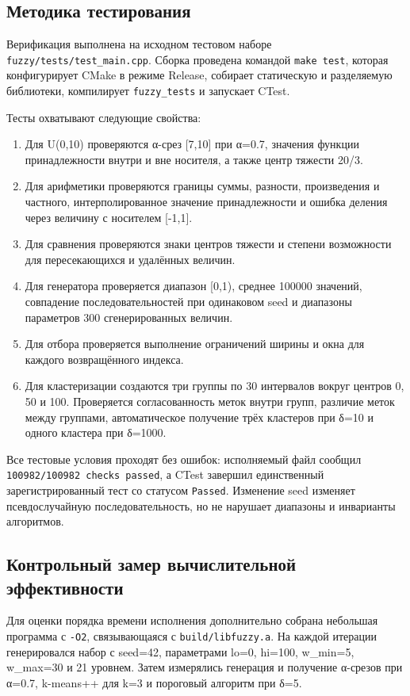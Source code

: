 \subsection{Методика тестирования}

Верификация выполнена на исходном тестовом наборе \texttt{fuzzy/tests/test\_main.cpp}. Сборка проведена командой \texttt{make test}, которая конфигурирует CMake в режиме Release, собирает статическую и разделяемую библиотеки, компилирует \texttt{fuzzy\_tests} и запускает CTest.

Тесты охватывают следующие свойства:

\begin{enumerate}
\item Для U(0,10) проверяются α-срез [7,10] при α=0.7, значения функции принадлежности внутри и вне носителя, а также центр тяжести 20/3.
\item Для арифметики проверяются границы суммы, разности, произведения и частного, интерполированное значение принадлежности и ошибка деления через величину с носителем [-1,1].
\item Для сравнения проверяются знаки центров тяжести и степени возможности для пересекающихся и удалённых величин.
\item Для генератора проверяется диапазон [0,1), среднее 100000 значений, совпадение последовательностей при одинаковом seed и диапазоны параметров 300 сгенерированных величин.
\item Для отбора проверяется выполнение ограничений ширины и окна для каждого возвращённого индекса.
\item Для кластеризации создаются три группы по 30 интервалов вокруг центров 0, 50 и 100. Проверяется согласованность меток внутри групп, различие меток между группами, автоматическое получение трёх кластеров при δ=10 и одного кластера при δ=1000.
\end{enumerate}

Все тестовые условия проходят без ошибок: исполняемый файл сообщил \texttt{100982/100982 checks passed}, а CTest завершил единственный зарегистрированный тест со статусом \texttt{Passed}. Изменение seed изменяет псевдослучайную последовательность, но не нарушает диапазоны и инварианты алгоритмов.

\subsection{Контрольный замер вычислительной эффективности}

Для оценки порядка времени исполнения дополнительно собрана небольшая программа с \texttt{-O2}, связывающаяся с \texttt{build/libfuzzy.a}. На каждой итерации генерировался набор с seed=42, параметрами lo=0, hi=100, w\_min=5, w\_max=30 и 21 уровнем. Затем измерялись генерация и получение α-срезов при α=0.7, k-means++ для k=3 и пороговый алгоритм при δ=5.

